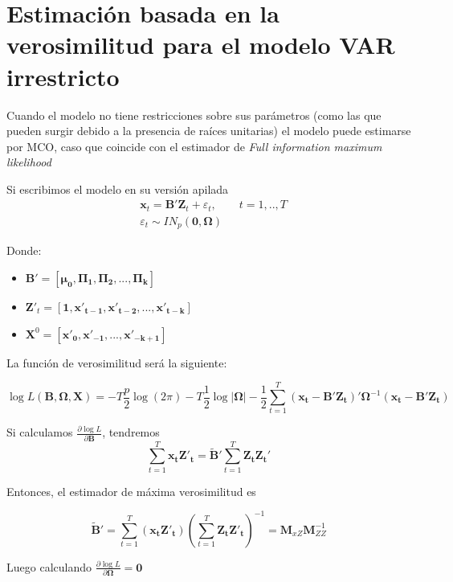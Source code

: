 \documentclass[12pt, twoside]{book}\usepackage[]{graphicx}\usepackage[]{color}
\let\bold\boldsymbol
\numberwithin{equation}{section}
\numberwithin{theorem}{section}
\numberwithin{teorema}{section}
\numberwithin{defi}{section}
\numberwithin{prop}{section}
\numberwithin{defi}{section}
\theoremstyle{plain}
\begin{document}
{{\section{Estimación basada en la verosimilitud para el modelo VAR irrestricto}

Cuando el modelo no tiene restricciones sobre sus parámetros (como las que pueden surgir debido a la presencia de raíces unitarias) el modelo puede estimarse por MCO, caso que coincide con el estimador de \textit{Full information maximum likelihood}

Si escribimos el modelo en su versión apilada
\begin{align}
& \bold{x}_{t} = \bold{B'Z}_{t}+\varepsilon_{t}, \qquad t=1,..,T \\ 
& \varepsilon_{t}\sim IN_{p}(\bold{0,\Omega})
\end{align}

Donde: 
\begin{itemize}
\item $\bold{B'}=\left[\boldsymbol{\mu_{0}, \Pi_{1}, \Pi_{2},...,\Pi_{k}}\right]$
\item $\bold{Z'}_{t} = \left[\bold{1,x'_{t-1}, x'_{t-2},...,x'_{t-k}}\right]$
\item $\bold{X}^{0} = \left[\bold{x'_{0}, x'_{-1},...,x'_{-k+1}}\right]$ 
\end{itemize}

La función de verosimilitud será la siguiente: 

\begin{equation}
\log L(\boldsymbol{B,\Omega,X}) = -T\frac{p}{2}\log(2\pi)-T\frac{1}{2}\log|\bold{\Omega}|-\frac{1}{2}\sum_{t=1}^{T}(\bold{x_{t}-B'Z_{t}})'\boldsymbol{\Omega}^{-1}(\bold{x_{t}-B'Z_{t}})
\end{equation}

Si calculamos $\frac{\partial \log L}{\partial \bold{B}}$, tendremos
\begin{equation*}
\sum_{t=1}^{T}\bold{x_{t}Z'_{t}} = \bold{\tilde{B}'}\sum_{t=1}^{T}\bold{Z_{t}Z_{t}'}
\end{equation*}

Entonces, el estimador de máxima verosimilitud es 

\begin{equation}
\bold{\tilde{B}}' = \sum_{t=1}^{T}(\bold{x_{t}Z'_{t}})\left(\sum_{t=1}^{T}\bold{Z_{t}Z'_{t}}\right)^{-1} = \bold{M}_{xZ}\bold{M}_{ZZ}^{-1}
\end{equation}

Luego calculando $\frac{\partial \log L}{\partial \boldsymbol{\Omega}}=\bold{0}$

}}
\end{document}

